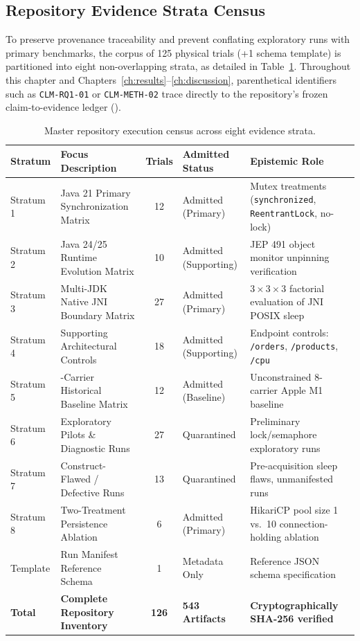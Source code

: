 \subsection{Repository Evidence Strata Census}
To preserve provenance traceability and prevent conflating exploratory runs with primary benchmarks, the corpus of 125 physical trials (+1 schema template) is partitioned into eight non-overlapping strata, as detailed in Table~\ref{tab:strata-census}. Throughout this chapter and Chapters~\ref{ch:results}--\ref{ch:discussion}, parenthetical identifiers such as \texttt{CLM-RQ1-01} or \texttt{CLM-METH-02} trace directly to the repository's frozen claim-to-evidence ledger ().

\begin{table}[htbp]
  \centering
  \caption{Master repository execution census across eight evidence strata.}
  \label{tab:strata-census}
  \begin{tabularx}{\textwidth}{@{}>{\raggedright\arraybackslash}p{}>{\raggedright\arraybackslash}p{}c>{\raggedright\arraybackslash}p{}>{\raggedright\arraybackslash}X@{}}
    \toprule
    \textbf{Stratum} & \textbf{Focus Description} & \textbf{Trials} & \textbf{Admitted Status} & \textbf{Epistemic Role} \\
    \midrule
    Stratum 1 & Java 21 Primary Synchronization Matrix & 12 & Admitted (Primary) & Mutex treatments (\texttt{synchronized}, \texttt{ReentrantLock}, no-lock) \\
    Stratum 2 & Java 24/25 Runtime Evolution Matrix & 10 & Admitted (Supporting) & JEP 491 object monitor unpinning verification \\
    Stratum 3 & Multi-JDK Native JNI Boundary Matrix & 27 & Admitted (Primary) & $3 \times 3 \times 3$ factorial evaluation of JNI POSIX sleep \\
    Stratum 4 & Supporting Architectural Controls & 18 & Admitted (Supporting) & Endpoint controls: \texttt{/orders}, \texttt{/products}, \texttt{/cpu} \\
    Stratum 5 & 8-Carrier Historical Baseline Matrix & 12 & Admitted (Baseline) & Unconstrained 8-carrier Apple M1 baseline \\
    Stratum 6 & Exploratory Pilots \& Diagnostic Runs & 27 & Quarantined & Preliminary lock/semaphore exploratory runs \\
    Stratum 7 & Construct-Flawed / Defective Runs & 13 & Quarantined & Pre-acquisition sleep flaws, unmanifested runs \\
    Stratum 8 & Two-Treatment Persistence Ablation & 6 & Admitted (Primary) & HikariCP pool size 1 vs.\ 10 connection-holding ablation \\
    Template & Run Manifest Reference Schema & 1 & Metadata Only & Reference JSON schema specification \\
    \midrule
    \textbf{Total} & \textbf{Complete Repository Inventory} & \textbf{126} & \textbf{543 Artifacts} & \textbf{Cryptographically SHA-256 verified} \\
    \bottomrule
  \end{tabularx}
\end{table}


